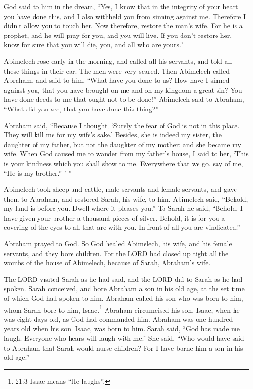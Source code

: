 \myverse{}God said to him in the dream, “Yes, I know that in the integrity of your heart you have done this, and I also withheld you from sinning against me. Therefore I didn’t allow you to touch her.  \myverse{}Now therefore, restore the man’s wife. For he is a prophet, and he will pray for you, and you will live. If you don’t restore her, know for sure that you will die, you, and all who are yours.”

\myverse{}Abimelech rose early in the morning, and called all his servants, and told all these things in their ear. The men were very scared.  \myverse{}Then Abimelech called Abraham, and said to him, “What have you done to us? How have I sinned against you, that you have brought on me and on my kingdom a great sin? You have done deeds to me that ought not to be done!”  \myverse{}Abimelech said to Abraham, “What did you see, that you have done this thing?”

\myverse{}Abraham said, “Because I thought, ‘Surely the fear of God is not in this place. They will kill me for my wife’s sake.’  \myverse{}Besides, she is indeed my sister, the daughter of my father, but not the daughter of my mother; and she became my wife.  \myverse{}When God caused me to wander from my father’s house, I said to her, ‘This is your kindness which you shall show to me. Everywhere that we go, say of me, “He is my brother.” ’ ”

\myverse{}Abimelech took sheep and cattle, male servants and female servants, and gave them to Abraham, and restored Sarah, his wife, to him.  \myverse{}Abimelech said, “Behold, my land is before you. Dwell where it pleases you.”  \myverse{}To Sarah he said, “Behold, I have given your brother a thousand pieces of silver. Behold, it is for you a covering of the eyes to all that are with you. In front of all you are vindicated.”

\myverse{}Abraham prayed to God. So God healed Abimelech, his wife, and his female servants, and they bore children.  \myverse{}For the LORD had closed up tight all the wombs of the house of Abimelech, because of Sarah, Abraham’s wife.

\mychapter{}
\myverse*{}The LORD visited Sarah as he had said, and the LORD did to Sarah as he had spoken. \myverse{}Sarah conceived, and bore Abraham a son in his old age, at the set time of which God had spoken to him. \myverse{}Abraham called his son who was born to him, whom Sarah bore to him, Isaac.\footnote{21:3 Isaac means “He laughs”.} \myverse{}Abraham circumcised his son, Isaac, when he was eight days old, as God had commanded him. \myverse{}Abraham was one hundred years old when his son, Isaac, was born to him. \myverse{}Sarah said, “God has made me laugh. Everyone who hears will laugh with me.” \myverse{}She said, “Who would have said to Abraham that Sarah would nurse children? For I have borne him a son in his old age.”

